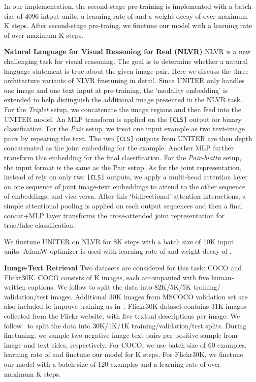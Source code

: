 \documentclass[runningheads]{llncs}
\begin{document}
In our implementation, the second-stage pre-training is implemented with a batch size of 4096 intput units, a learning rate of  and a weight decay of  over maximum K steps. After second-stage pre-traing, we finetune our model with a learning rate of  over maximum K steps.

\vspace{5pt}
\noindent \textbf{Natural Language for Visual Reasoning for Real (NLVR)}
NLVR is a new challenging task for visual reasoning.
The goal is to determine whether a natural language statement is true about the given image pair. 
Here we discuss the three architecture variants of NLVR finetuning in detail.
Since UNITER only handles one image and one text input at pre-training, the `modality embedding' is extended to help distinguish the additional image presented in the NLVR task.
For the \emph{Triplet} setup, we concatenate the image regions and then feed into the UNITER model.
An MLP transform is applied on the \texttt{[CLS]} output for binary classification.
For the \emph{Pair} setup, we treat one input example as two text-image pairs by repeating the text.
The two \texttt{[CLS]} outputs from UNITER are then depth concatenated as the joint embedding for the example.
Another MLP further transform this embedding for the final classification.
For the \emph{Pair-biattn} setup, the input format is the same as the Pair setup.
As for the joint representation, instead of rely on only two \texttt{[CLS]} outputs, we apply a multi-head attention layer~\cite{vaswani2017attention} on one sequence of joint image-text embeddings to attend to the other sequence of embeddings, and vice versa.
After this `bidirectional' attention interactions, a simple attentional pooling is applied on each output sequences and then a final concat+MLP layer transforms the cross-attended joint representation for true/false classification.

We finetune UNITER on NLVR for 8K steps with a batch size of 10K input units. AdamW optimizer is used with learning rate of  and weight decay of .





\vspace{5pt}
\noindent \textbf{Image-Text Retrieval} 
Two datasets are considered for this task: COCO and Flickr30K. COCO consists of K images, each accompanied with five human-written captions. We follow \cite{karpathy2015deep} to split the data into 82K/5K/5K training/ validation/test images. Additional 30K images from MSCOCO validation set are also included to improve training as in~\cite{lee2018stacked}. Flickr30K dataset contains 31K images collected from the Flickr website, with five textual descriptions per image. We follow~\cite{karpathy2015deep} to split the data into 30K/1K/1K  training/validation/test splits. During finetuning, we sample two negative image-text pairs per positive sample from image and text sides, respectively. For COCO, we use batch size of 60 examples, learning rate of  and finetune our model for K steps. For Flickr30K, we finetune our model with a batch size of 120 examples and a learning rate of  over maximum K steps. 
\end{document}
